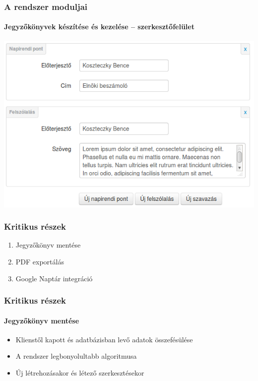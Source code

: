\documentclass[12pt]{beamer}
\begin{document}
\begin{frame}
    \frametitle{A rendszer moduljai}
    \framesubtitle{Jegyzőkönyvek készítése és kezelése -- szerkesztőfelület}
    
    \includegraphics[width=\textwidth,center]{jegyzokonyv-szerkesztes.png}
\end{frame}

\begin{frame}
    \frametitle{Kritikus részek}
    
    \Large
    \begin{enumerate}
        \item Jegyzőkönyv mentése
        \item PDF exportálás
        \item Google Naptár integráció
    \end{enumerate}
\end{frame}

\begin{frame}
    \frametitle{Kritikus részek}
    \framesubtitle{Jegyzőkönyv mentése}

    \large    
    \begin{itemize}
        \item Klienstől kapott és adatbázisban levő adatok összefésülése
        \item A rendszer legbonyolultabb algoritmusa
        \item Új létrehozásakor és létező szerkesztésekor
    \end{itemize}
\end{frame}
\end{document}
